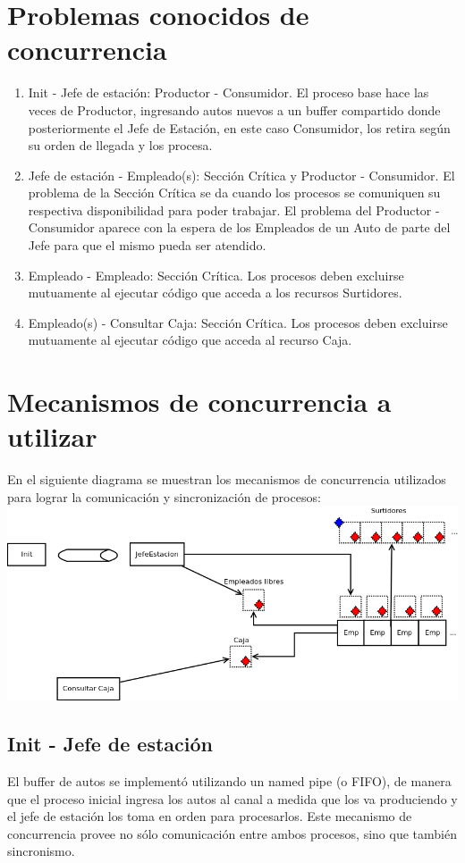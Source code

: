 \documentclass{article}
\begin{document}
\section{Problemas conocidos de concurrencia}
\begin{enumerate}
	\item Init - Jefe de estación: Productor - Consumidor. El proceso base hace las veces de Productor, ingresando autos nuevos a un buffer compartido donde posteriormente el Jefe de Estación, en este caso Consumidor, los retira según su orden de llegada y los procesa.
	\item Jefe de estación - Empleado(s): Sección Crítica y Productor - Consumidor. El problema de la Sección Crítica se da cuando los procesos se comuniquen su respectiva disponibilidad para poder trabajar. El problema del Productor - Consumidor aparece con la espera de los Empleados de un Auto de parte del Jefe para que el mismo pueda ser atendido.
	\item Empleado - Empleado: Sección Crítica. Los procesos deben excluirse mutuamente al ejecutar código que acceda a los recursos Surtidores.
	\item Empleado(s) - Consultar Caja: Sección Crítica. Los procesos deben excluirse mutuamente al ejecutar código que acceda al recurso Caja.
\end{enumerate}
\section{Mecanismos de concurrencia a utilizar}
En el siguiente diagrama se muestran los mecanismos de concurrencia utilizados para lograr la comunicación y sincronización de procesos:
\\[1\baselineskip]
\includegraphics[width=\textwidth]{mecanismos}
\subsection{Init - Jefe de estación}
El buffer de autos se implementó utilizando un named pipe (o FIFO), de manera que el proceso inicial ingresa los autos al canal a medida que los va produciendo y el jefe de estación los toma en orden para procesarlos. Este mecanismo de concurrencia provee no sólo comunicación entre ambos procesos, sino que también sincronismo.
\end{document}
